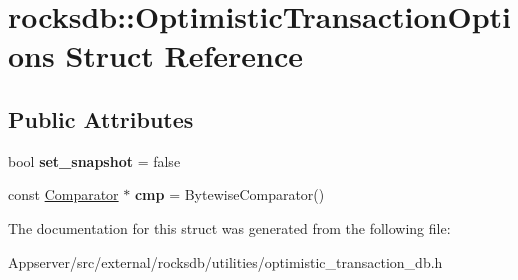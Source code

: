 \hypertarget{structrocksdb_1_1OptimisticTransactionOptions}{}\section{rocksdb\+:\+:Optimistic\+Transaction\+Options Struct Reference}
\label{structrocksdb_1_1OptimisticTransactionOptions}
\subsection*{Public Attributes}
\begin{DoxyCompactItemize}
\item 
bool {\bfseries set\+\_\+snapshot} = false\hypertarget{structrocksdb_1_1OptimisticTransactionOptions_a36f79773674c3c10fdddcec17b4693b3}{}\label{structrocksdb_1_1OptimisticTransactionOptions_a36f79773674c3c10fdddcec17b4693b3}

\item 
const \hyperlink{classrocksdb_1_1Comparator}{Comparator} $\ast$ {\bfseries cmp} = Bytewise\+Comparator()\hypertarget{structrocksdb_1_1OptimisticTransactionOptions_aebd579593ac00db259c18214a3790319}{}\label{structrocksdb_1_1OptimisticTransactionOptions_aebd579593ac00db259c18214a3790319}

\end{DoxyCompactItemize}


The documentation for this struct was generated from the following file\+:\begin{DoxyCompactItemize}
\item 
Appserver/src/external/rocksdb/utilities/optimistic\+\_\+transaction\+\_\+db.\+h\end{DoxyCompactItemize}
